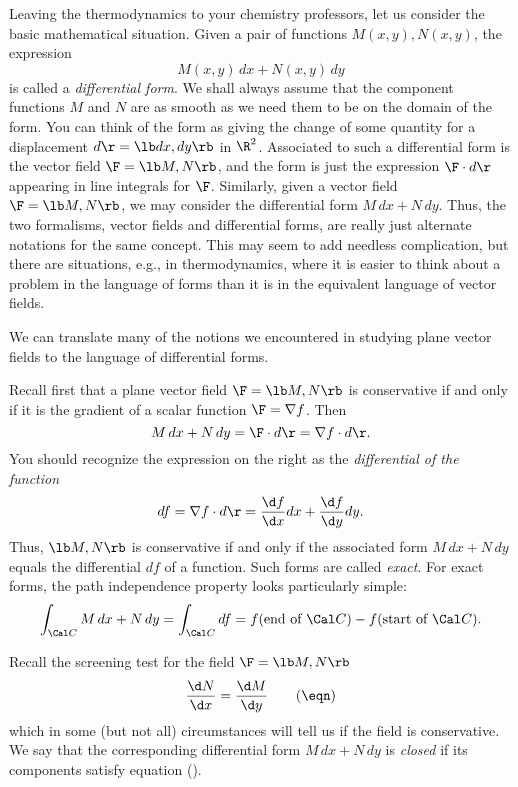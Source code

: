 Leaving the thermodynamics to your chemistry professors, let
us consider the basic mathematical situation.  Given a pair
of functions $M(x,y), N(x,y)$, the expression
$$
    M(x,y)\,dx + N(x,y)\,dy
$$
is called a {\it differential form}. 
We shall always assume that the component functions $M$ and $N$
are as smooth as we need them to be on the domain of the form.
You can think of the form as giving the change of some quantity for
a displacement $d\r = \lb dx, dy \rb$ in $\R^2$.   Associated
to such a differential form is the vector field $\F = \lb M, N \rb$,
and the form is just the expression $\F\cdot d\r$ appearing in
line integrals for $\F$.  Similarly, given a vector field
$\F = \lb M, N \rb$, we may consider the differential
form $M\,dx + N\,dy$. Thus, the two formalisms, vector fields
and differential forms, are really just alternate
notations for the same concept. This may seem to add needless
complication, but  there are situations,
e.g., in thermodynamics, where it is easier to think
about a problem in the language of forms than it is in the
equivalent language of vector fields.

We can translate many of the notions we encountered in studying
plane vector fields to the language of differential forms.

Recall first that a plane vector field $\F = \lb M, N \rb$
is conservative if and only if it is the gradient of a scalar
function  $\F = \nabla f$.  Then  
$$
   M\,dx + N\,dy =  \F\cdot d\r = \nabla f\cdot d\r.
$$
You should recognize the expression on the right as the
{\it differential of the function\/} 
$$
df = \nabla f\cdot d\r = \frac{\d f}{\d x}dx + \frac{\d f}{\d y}dy.
$$
Thus, $\lb M, N\rb$ is conservative if and only if the
associated form $M\,dx + N\,dy$ equals the
 differential $df$ of a function.
Such forms are called {\it exact}.   For exact forms, the
%
path independence property looks particularly simple:
$$
\int_{\Cal C} M\,dx + N\,dy = \int_{\Cal C} df =
   f(\text{end of }\Cal C) - f(\text{start of }\Cal C).
$$ 

 Recall  the screening test for the field $\F = \lb M, N \rb$ 
%
\nexteqn
$$
\frac{\d N}{\d x} = \frac{\d M}{\d y}\tag\eqn
$$
which in some (but not all) circumstances will tell us if the
field is conservative.  We say that the corresponding differential
form $M\,dx + N\,dy$ is {\it closed\/} if its components
satisfy equation (\eqn).
%
%

